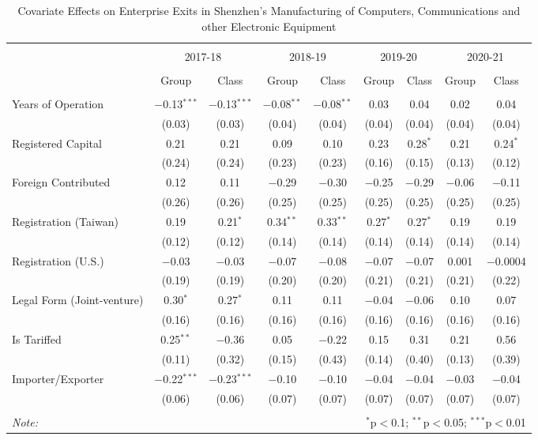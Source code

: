 \begin{table}[!htbp] \centering
  \caption{Covariate Effects on Enterprise Exits in Shenzhen's Manufacturing of Computers, Communications and other Electronic Equipment}
  \setlength\tabcolsep{2pt}
  \begin{tabular}{lcccccccc}
    \\[-1.8ex]\hline \hline \\[-1.8ex]
    & \multicolumn{2}{c}{2017-18} & \multicolumn{2}{c}{2018-19} & \multicolumn{2}{c}{2019-20} & \multicolumn{2}{c}{2020-21} \\
    \\[-1.8ex] & Group & Class & Group & Class & Group & Class & Group & Class \\
    \hline \\[-1.8ex]
    Years of Operation & $-$0.13$^{***}$ & $-$0.13$^{***}$ & $-$0.08$^{**}$ & $-$0.08$^{**}$ & 0.03 & 0.04 & 0.02 & 0.04 \\
    & (0.03) & (0.03) & (0.04) & (0.04) & (0.04) & (0.04) & (0.04) & (0.04) \\
    Registered Capital & 0.21 & 0.21 & 0.09 & 0.10 & 0.23 & 0.28$^{*}$ & 0.21 & 0.24$^{*}$ \\
    & (0.24) & (0.24) & (0.23) & (0.23) & (0.16) & (0.15) & (0.13) & (0.12) \\
    Foreign Contributed & 0.12 & 0.11 & $-$0.29 & $-$0.30 & $-$0.25 & $-$0.29 & $-$0.06 & $-$0.11 \\
    & (0.26) & (0.26) & (0.25) & (0.25) & (0.25) & (0.25) & (0.25) & (0.25) \\
    Registration (Taiwan) & 0.19 & 0.21$^{*}$ & 0.34$^{**}$ & 0.33$^{**}$ & 0.27$^{*}$ & 0.27$^{*}$ & 0.19 & 0.19 \\
    & (0.12) & (0.12) & (0.14) & (0.14) & (0.14) & (0.14) & (0.14) & (0.14) \\
    Registration (U.S.) & $-$0.03 & $-$0.03 & $-$0.07 & $-$0.08 & $-$0.07 & $-$0.07 & 0.001 & $-$0.0004 \\
    & (0.19) & (0.19) & (0.20) & (0.20) & (0.21) & (0.21) & (0.21) & (0.22) \\
    Legal Form (Joint-venture) & 0.30$^{*}$ & 0.27$^{*}$ & 0.11 & 0.11 & $-$0.04 & $-$0.06 & 0.10 & 0.07 \\
    & (0.16) & (0.16) & (0.16) & (0.16) & (0.16) & (0.16) & (0.16) & (0.16) \\
    Is Tariffed & 0.25$^{**}$ & $-$0.36 & 0.05 & $-$0.22 & 0.15 & 0.31 & 0.21 & 0.56 \\
    & (0.11) & (0.32) & (0.15) & (0.43) & (0.14) & (0.40) & (0.13) & (0.39) \\
    Importer/Exporter & $-$0.22$^{***}$ & $-$0.23$^{***}$ & $-$0.10 & $-$0.10 & $-$0.04 & $-$0.04 & $-$0.03 & $-$0.04 \\
    & (0.06) & (0.06) & (0.07) & (0.07) & (0.07) & (0.07) & (0.07) & (0.07) \\
    \hline \hline \\[-1.8ex]
    \textit{Note:}  & \multicolumn{8}{r}{$^{*}$p$<$0.1; $^{**}$p$<$0.05; $^{***}$p$<$0.01} \\
  \end{tabular}
\end{table}

